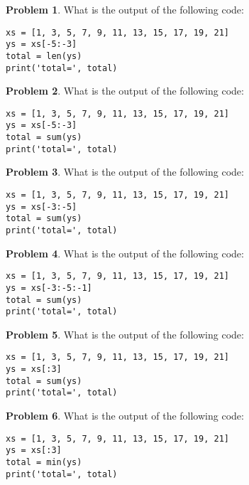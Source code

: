 \documentclass[10pt]{article}
\theoremstyle{definition}
\newtheorem{problem}{Problem}
\begin{document}
\begin{problem}
    What is the output of the following code:
\end{problem}
\begin{lstlisting}
xs = [1, 3, 5, 7, 9, 11, 13, 15, 17, 19, 21]
ys = xs[-5:-3]
total = len(ys)
print('total=', total)
\end{lstlisting}
\vspace{2in}

\begin{problem}
    What is the output of the following code:
\end{problem}
\begin{lstlisting}
xs = [1, 3, 5, 7, 9, 11, 13, 15, 17, 19, 21]
ys = xs[-5:-3]
total = sum(ys)
print('total=', total)
\end{lstlisting}
\vspace{2in}

\begin{problem}
    What is the output of the following code:
\end{problem}
\begin{lstlisting}
xs = [1, 3, 5, 7, 9, 11, 13, 15, 17, 19, 21]
ys = xs[-3:-5]
total = sum(ys)
print('total=', total)
\end{lstlisting}
\vspace{2in}

\begin{problem}
    What is the output of the following code:
\end{problem}
\begin{lstlisting}
xs = [1, 3, 5, 7, 9, 11, 13, 15, 17, 19, 21]
ys = xs[-3:-5:-1]
total = sum(ys)
print('total=', total)
\end{lstlisting}
\vspace{2in}

\begin{problem}
    What is the output of the following code:
\end{problem}
\begin{lstlisting}
xs = [1, 3, 5, 7, 9, 11, 13, 15, 17, 19, 21]
ys = xs[:3]
total = sum(ys)
print('total=', total)
\end{lstlisting}
\vspace{2in}

\begin{problem}
    What is the output of the following code:
\end{problem}
\begin{lstlisting}
xs = [1, 3, 5, 7, 9, 11, 13, 15, 17, 19, 21]
ys = xs[:3]
total = min(ys)
print('total=', total)
\end{lstlisting}
\vspace{2in}
\end{document}
